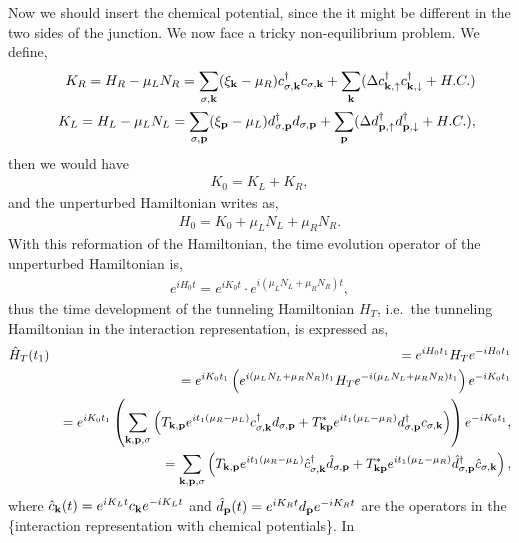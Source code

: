 \documentclass[11pt]{article}
\begin{document}
    Now we should insert the chemical potential, since the it might be
different in the two sides of the junction. We now face a tricky
non-equilibrium problem. We define, \begin{eqnarray}
&& K_R=H_R-\mu_L N_R=\sum_{\sigma,{\bf k}}(\xi_{\bf k}-\mu_R)
c^{\dagger}_{\sigma,{\bf k}}c_{\sigma,{\bf k}}+\sum_{{\bf k}}
(\Delta c^{\dagger}_{{\bf k},\uparrow}c^{\dagger}_{{\bf
k},\downarrow}+H.C.)
\nonumber\\\nonumber
&& K_L=H_L-\mu_L N_L=\sum_{\sigma,{\bf p}}(\xi_{\bf p}-\mu_L)
d^{\dagger}_{\sigma,{\bf p}}d_{\sigma,{\bf p}}+\sum_{{\bf p}}
(\Delta d^{\dagger}_{{\bf p},\uparrow}d^{\dagger}_{{\bf
p},\downarrow}+H.C.),\\
\end{eqnarray} then we would have \begin{eqnarray}
K_0=K_L+K_R,
\end{eqnarray} and the unperturbed Hamiltonian writes as,
\begin{eqnarray}
H_0=K_0+\mu_L N_L+\mu_R N_R.
\end{eqnarray} With this reformation of the Hamiltonian, the time
evolution operator of the unperturbed Hamiltonian is, \begin{eqnarray}
e^{iH_0t}=e^{iK_0t}\cdot e^{i(\mu_L N_L+\mu_R N_R)t},
\end{eqnarray} thus the time development of the tunneling Hamiltonian
\(H_T\), i.e.~the tunneling Hamiltonian in the interaction
representation, is expressed as, \begin{eqnarray}
\hat H_T(t_1) &&=e^{iH_0t_1}H_Te^{-iH_0t_1}
 \\
 &&=e^{iK_0t_1}\left(e^{i(\mu_L N_L+\mu_R
N_R)t_1}H_Te^{-i(\mu_L N_L+\mu_R N_R)t_1}\right)e^{-iK_0t_1}
\nonumber\\
&&=e^{iK_0t_1}\left(\sum_{{\bf k},{\bf p},\sigma}\left(T_{{\bf k},{\bf p}} e^{it_1(\mu_R-\mu_L)}c^{\dagger}_{\sigma,{\bf k}}d_{\sigma,{\bf
p}}+T^*_{{\bf k}{\bf p}}e^{it_1(\mu_L-\mu_R)}d^{\dagger}_{\sigma,\bf
p} c_{\sigma, \bf k}\right)\right)e^{-iK_0t_1},
\nonumber\\
&& = \sum_{{\bf k},{\bf p},\sigma}\left(T_{{\bf k},{\bf p}} e^{it_1(\mu_R-\mu_L)} \hat c^{\dagger}_{\sigma,{\bf k}} \hat d_{\sigma,{\bf
p}}+T^*_{{\bf k}{\bf p}}e^{it_1(\mu_L-\mu_R)} \hat d^{\dagger}_{\sigma,\bf
p} \hat c_{\sigma, \bf k}\right),\nonumber
\end{eqnarray} where
\(\hat c_{\bf k}(t)=e^{i K_L t}c_{\bf k}e^{-i K_L t}\) and
\(\hat d_{\bf p}(t)=e^{i K_R t}d_{\bf p}e^{-i K_R t}\) are the operators
in the \{\pb interaction representation with chemical potentials\}. In
\end{document}
